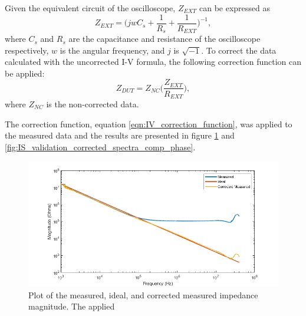\par Given the equivalent circuit of the oscilloscope, $Z_{EXT}$ can be expressed as
\begin{equation}
    Z_{EXT} = \bigg(jwC_{s}+\frac{1}{R_{s}}+\frac{1}{R_{EXT}}\bigg)^{-1},
    \label{eqn:corrected_Rext}
\end{equation}
\noindent where $C_{s}$ and $R_{s}$ are the capacitance and resistance of the oscilloscope respectively, $w$ is the angular frequency, and $j$ is $\sqrt{-1}$. To correct the data calculated with the uncorrected I-V formula, the following correction function can be applied:
\begin{equation}
    Z_{DUT} = Z_{NC}\bigg(\frac{Z_{EXT}}{R_{EXT}}\bigg),
    \label{eqn:IV_correction_function}
\end{equation}
\noindent where $Z_{NC}$ is the non-corrected data. 

\par The correction function, equation \ref{eqn:IV_correction_function}, was applied to the measured data and the results are presented in figure \ref{fig:IS_validation_corrected_spectra_comp_mag} and \ref{fig:IS_validation_corrected_spectra_comp_phase}. 

\vspace{0.4 in}

\begin{figure}[H]
    \centering
    \includegraphics[width=\textwidth]{images/CorrectedImpedanceMag.png}
    \caption{Plot of the measured, ideal, and corrected measured impedance magnitude. The applied}
    \label{fig:IS_validation_corrected_spectra_comp_mag}
\end{figure}

